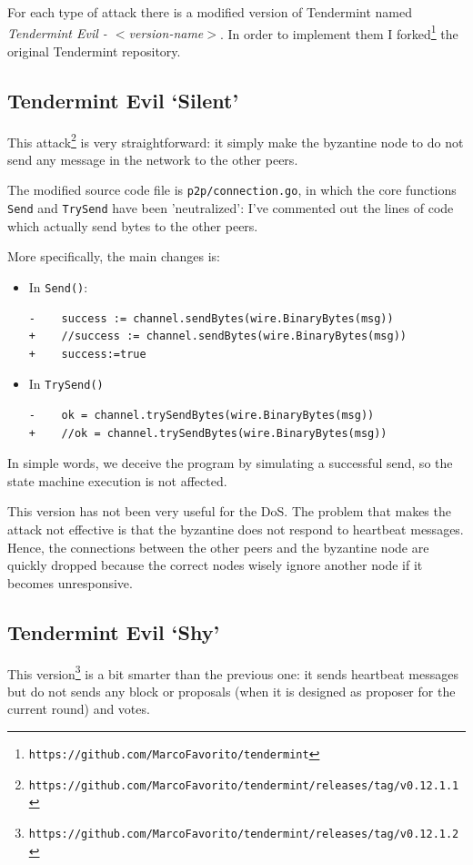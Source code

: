 \documentclass[]{article}
\begin{document}
For each type of attack there is a modified version of Tendermint named \textit{Tendermint Evil - $<$version-name$>$}. In order to implement them I forked\footnote{\texttt{https://github.com/MarcoFavorito/tendermint}} the original Tendermint repository.

\subsection{Tendermint Evil `Silent'}
This attack\footnote{\texttt{https://github.com/MarcoFavorito/tendermint/releases/tag/v0.12.1.1}} is very straightforward: it simply make the byzantine node to do not send any message in the network to the other peers.

The modified source code file is \texttt{p2p/connection.go}, in which the core functions \texttt{Send} and \texttt{TrySend} have been 'neutralized': I've commented out the lines of code which actually send bytes to the other peers.

More specifically, the main changes is:
\begin{itemize}
\item In \texttt{Send()}:
\begin{verbatim}
-    success := channel.sendBytes(wire.BinaryBytes(msg))
+    //success := channel.sendBytes(wire.BinaryBytes(msg))
+    success:=true
\end{verbatim}
\item In \texttt{TrySend()}
\begin{verbatim}
-    ok = channel.trySendBytes(wire.BinaryBytes(msg))
+    //ok = channel.trySendBytes(wire.BinaryBytes(msg))
\end{verbatim}
\end{itemize}

In simple words, we deceive the program by simulating a successful send, so the state machine execution is not affected.

This version has not been very useful for the DoS. The problem that makes the attack not effective is that the byzantine does not respond to heartbeat messages. Hence, the connections between the other peers and the byzantine node are quickly dropped because the correct nodes wisely ignore another node if it becomes unresponsive.

\subsection{Tendermint Evil `Shy'}
\label{shy}
This version\footnote{\texttt{https://github.com/MarcoFavorito/tendermint/releases/tag/v0.12.1.2}} is a bit smarter than the previous one: it sends heartbeat messages but do not sends any block or proposals (when it is designed as proposer for the current round) and votes.
\end{document}
